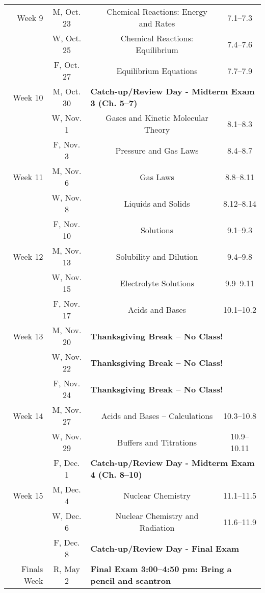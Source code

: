 \begin{tabular}{rcccc}
\midrule
Week 9 & M, Oct. 23&& Chemical Reactions: Energy and Rates & 7.1--7.3\\
& W, Oct. 25&& Chemical Reactions: Equilibrium & 7.4--7.6\\
& F, Oct. 27&& Equilibrium Equations & 7.7--7.9\\
\midrule
Week 10 & M, Oct. 30& \multicolumn{3}{l}{\textbf{Catch-up/Review Day - Midterm Exam 3 (Ch. 5--7)}}\\
& W, Nov. 1&& Gases and Kinetic Molecular Theory & 8.1--8.3\\
& F, Nov. 3&& Pressure and Gas Laws & 8.4--8.7\\
\midrule
Week 11 & M, Nov. 6&& Gas Laws & 8.8--8.11\\
& W, Nov. 8&& Liquids and Solids & 8.12--8.14\\
& F, Nov. 10&& Solutions & 9.1--9.3\\
\midrule
Week 12 & M, Nov. 13&& Solubility and Dilution & 9.4--9.8\\
& W, Nov. 15&& Electrolyte Solutions & 9.9--9.11\\
& F, Nov. 17&& Acids and Bases & 10.1--10.2\\
\midrule
Week 13 & M, Nov. 20& \multicolumn{3}{l}{\textbf{Thanksgiving Break -- No Class!}}\\
& W, Nov. 22& \multicolumn{3}{l}{\textbf{Thanksgiving Break -- No Class!}}\\
& F, Nov. 24& \multicolumn{3}{l}{\textbf{Thanksgiving Break -- No Class!}}\\
\midrule
Week 14 & M, Nov. 27&& Acids and Bases -- Calculations & 10.3--10.8\\
& W, Nov. 29&& Buffers and Titrations & 10.9--10.11\\
& F, Dec. 1& \multicolumn{3}{l}{\textbf{Catch-up/Review Day - Midterm Exam 4 (Ch. 8--10)}}\\
\midrule
Week 15 & M, Dec. 4&& Nuclear Chemistry & 11.1--11.5\\
& W, Dec. 6&& Nuclear Chemistry and Radiation & 11.6--11.9\\
& F, Dec. 8& \multicolumn{3}{l}{\textbf{Catch-up/Review Day - Final Exam}}\\
\midrule
Finals Week& R, May 2& \multicolumn{3}{l}{\textbf{Final Exam 3:00--4:50 pm: Bring a pencil and scantron}}\\
\end{tabular}